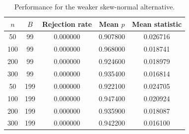 \begin{table}[htbp]
\centering
\caption{Performance for the weaker skew-normal alternative.}
\label{tab:hard-to-tell}
\begin{tabular}{ccccc}
\hline
$n$ & $B$ & Rejection rate & Mean $p$ & Mean statistic \\
\hline
50 & 99 & 0.000000 & 0.907800 & 0.026716 \\
100 & 99 & 0.000000 & 0.968000 & 0.018741 \\
200 & 99 & 0.000000 & 0.924600 & 0.018979 \\
300 & 99 & 0.000000 & 0.935400 & 0.016814 \\
50 & 199 & 0.000000 & 0.922100 & 0.024705 \\
100 & 199 & 0.000000 & 0.947400 & 0.020924 \\
200 & 199 & 0.000000 & 0.935900 & 0.018087 \\
300 & 199 & 0.000000 & 0.942200 & 0.016100 \\
\hline
\end{tabular}
\end{table}

